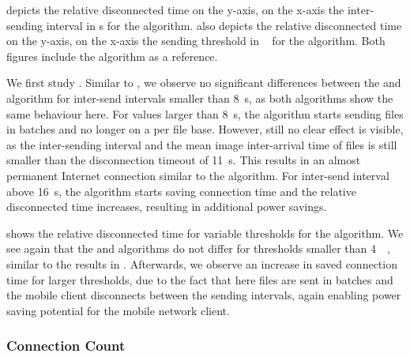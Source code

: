  depicts the relative disconnected time \relativeDisconnectedTime on the y-axis, on the x-axis the inter-sending interval in \si{\second} for the \algointerval algorithm. 
 also depicts the relative disconnected time on the y-axis, on the x-axis the sending threshold in \si{\mega\byte} for the \algosize algorithm. 
Both figures include the \algoimmediate algorithm as a reference.

We first study .
Similar to , we observe no significant differences between the \algointerval and \algoimmediate algorithm for inter-send intervals smaller than \SI{8}{\second}, as both algorithms show the same behaviour here.
For values larger than \SI{8}{\second}, the \algointerval algorithm starts sending files in batches and no longer on a per file base.
However, still no clear effect is visible, as the inter-sending interval and the mean image inter-arrival time of files is still smaller than the disconnection timeout of \SI{11}{\second}.
This results in an almost permanent Internet connection similar to the \algoimmediate algorithm.
For inter-send interval above \SI{16}{\second}, the \algointerval algorithm starts saving connection time and the relative disconnected time increases, resulting in additional power savings.

 shows the relative disconnected time for variable thresholds for the \algosize algorithm.
We see again that the \algosize and \algoimmediate algorithms do not differ for thresholds smaller than \SI{4}{\mega\byte}, similar to the results in .
Afterwards, we observe an increase in saved connection time for larger thresholds, due to the fact that here files are sent in batches and the mobile client disconnects between the sending intervals, again enabling power saving potential for the mobile network client.

\subsubsection*{Connection Count}\label{sec:application:cloud_file_synchronisation:numerical_evaluation:connection_count}

